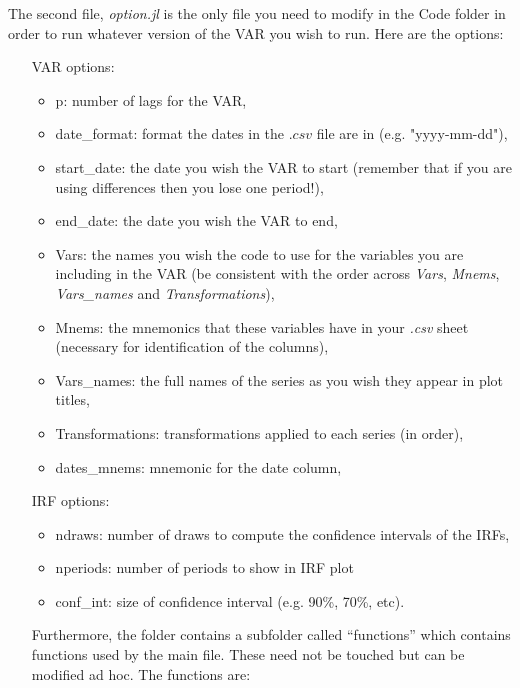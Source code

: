 \documentclass[11pt]{article}
\begin{document}
The second file, \textit{option.jl} is the only file you need to modify in the Code folder in order to run whatever version of the VAR you wish to run. Here are the options:
\begin{itemize}
\item[VAR options:]
  \begin{itemize}
  \item p: number of lags for the VAR,
  \item date\_format: format the dates in the $.csv$ file are in (e.g. "yyyy-mm-dd"),
  \item start\_date: the date you wish the VAR to start (remember that if you are using differences then you lose one period!),
  \item end\_date: the date you wish the VAR to end,
  \item Vars: the names you wish the code to use for the variables you are including in the VAR (be consistent with the order across \textit{Vars}, \textit{Mnems}, \textit{Vars\_names} and \textit{Transformations}),
  \item Mnems: the mnemonics that these variables have in your \textit{.csv} sheet (necessary for identification of the columns),
  \item Vars\_names: the full names of the series as you wish they appear in plot titles,
  \item Transformations: transformations applied to each series (in order),
  \item dates\_mnems: mnemonic for the date column,
  \end{itemize}
\item[IRF options:]
  \begin{itemize}
  \item ndraws: number of draws to compute the confidence intervals of the IRFs,
  \item nperiods: number of periods to show in IRF plot
  \item conf\_int: size of confidence interval (e.g. 90\%, 70\%, etc).
  \end{itemize}

Furthermore, the folder contains a subfolder called ``functions'' which contains functions used by the main file. These need not be touched but can be modified ad hoc. The functions are:


\end{itemize}
\end{document}
